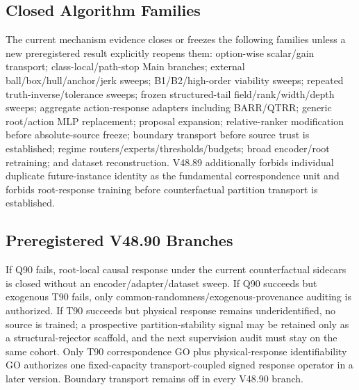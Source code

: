 \documentclass[conference]{IEEEtran}
\begin{document}
\subsection{Closed Algorithm Families}
The current mechanism evidence closes or freezes the following families unless a new preregistered result explicitly reopens them: option-wise scalar/gain transport; class-local/path-stop Main branches; external ball/box/hull/anchor/jerk sweeps; B1/B2/high-order viability sweeps; repeated truth-inverse/tolerance sweeps; frozen structured-tail field/rank/width/depth sweeps; aggregate action-response adapters including BARR/QTRR; generic root/action MLP replacement; proposal expansion; relative-ranker modification before absolute-source freeze; boundary transport before source trust is established; regime routers/experts/thresholds/budgets; broad encoder/root retraining; and dataset reconstruction. V48.89 additionally forbids individual duplicate future-instance identity as the fundamental correspondence unit and forbids root-response training before counterfactual partition transport is established.

\subsection{Preregistered V48.90 Branches}
If Q90 fails, root-local causal response under the current counterfactual sidecars is closed without an encoder/adapter/dataset sweep. If Q90 succeeds but exogenous T90 fails, only common-randomness/exogenous-provenance auditing is authorized. If T90 succeeds but physical response remains underidentified, no source is trained; a prospective partition-stability signal may be retained only as a structural-rejector scaffold, and the next supervision audit must stay on the same cohort. Only T90 correspondence GO plus physical-response identifiability GO authorizes one fixed-capacity transport-coupled signed response operator in a later version. Boundary transport remains off in every V48.90 branch.



\end{document}
